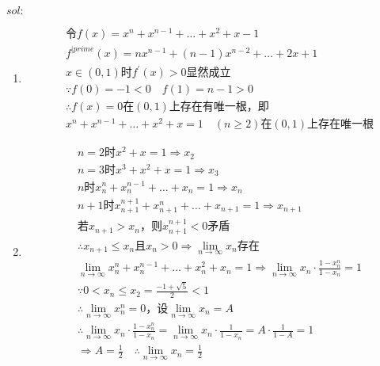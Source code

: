 \begin{enumerate}[{例}1.]
        $sol:$
        \begin{enumerate}[(1)]
            \item
                \begin{align*}
                    &\mbox{令}f(x)=x^n+x^{n-1}+\dots+x^2+x-1\\
                    &f^{|prime}(x)=nx^{n-1}+(n-1)x^{n-2}+\dots+2x+1\\
                    &x\in(0,1)\mbox{时}f^{\prime}(x)>0\mbox{显然成立}\\
                    &\because f(0)=-1<0\quad f(1)=n-1>0\\
                    &\therefore f(x)=0\mbox{在}(0,1)\mbox{上存在有唯一根，即}\\
                    &x^n+x^{n-1}+\dots+x^2+x=1\quad(n\geq 2)\mbox{在}(0,1)\mbox{上存在唯一根}
                \end{align*}
            \item
                \begin{align*}
                    &n=2\mbox{时}x^2+x=1\Rightarrow x_2\\
                    &n=3\mbox{时}x^3+x^2+x=1\Rightarrow x_3\\
                    &n\mbox{时}x_n^n+x_n^{n-1}+\dots+x_n=1\Rightarrow x_n\\
                    &n+1\mbox{时}x_{n+1}^{n+1}+x_{n+1}^{n}+\dots+x_{n+1}=1\Rightarrow x_{n+1}\\
                    &\mbox{若}x_{n+1}>x_n\mbox{，则}x_{n+1}^{n+1}<0\mbox{矛盾}\\
                    &\therefore x_{n+1}\leq x_n\mbox{且}x_n>0\Rightarrow \lim_{n\to\infty}x_n\mbox{存在}\\
                    &\lim_{n\to\infty}x_n^n+x_n^{n-1}+\dots+x_n^2+x_n=1\Rightarrow\lim_{n\to\infty}x_n\cdot\frac{1-x_n^n}{1-x_n}=1\\
                    &\because 0<x_n\leq x_2=\frac{-1+\sqrt{5}}{2}<1\\
                    &\therefore \lim_{n\to\infty}x_n^n=0\mbox{，设}\lim_{n\to\infty}x_n=A\\
                    &\therefore\lim_{n\to\infty}x_n\cdot\frac{1-x_n^n}{1-x_n}=\lim_{n\to\infty}x_n\cdot\frac{1}{1-x_n}=A\cdot\frac{1}{1-A}=1\\
                    &\Rightarrow A=\frac{1}{2}\quad\therefore\lim_{n\to\infty}x_n=\frac{1}{2}
                \end{align*}
        \end{enumerate}
    \end{enumerate}
